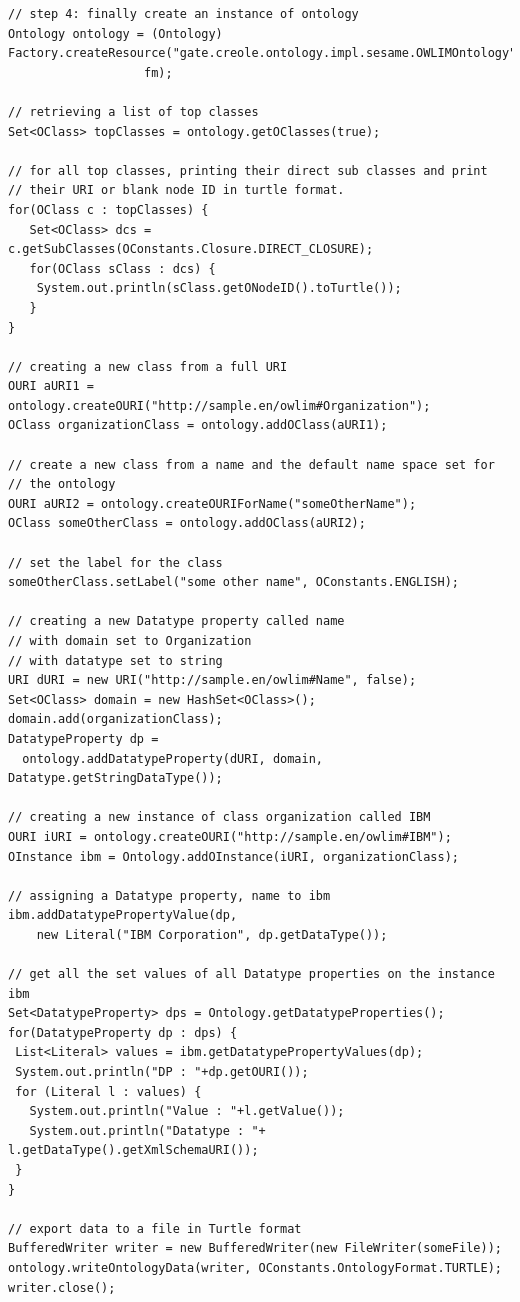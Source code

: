 {\begin{lstlisting}
// step 4: finally create an instance of ontology
Ontology ontology = (Ontology)
Factory.createResource("gate.creole.ontology.impl.sesame.OWLIMOntology",
                   fm);

// retrieving a list of top classes
Set<OClass> topClasses = ontology.getOClasses(true);

// for all top classes, printing their direct sub classes and print 
// their URI or blank node ID in turtle format.
for(OClass c : topClasses) {
   Set<OClass> dcs = c.getSubClasses(OConstants.Closure.DIRECT_CLOSURE);
   for(OClass sClass : dcs) {
	System.out.println(sClass.getONodeID().toTurtle());
   }
}

// creating a new class from a full URI
OURI aURI1 = ontology.createOURI("http://sample.en/owlim#Organization");
OClass organizationClass = ontology.addOClass(aURI1);

// create a new class from a name and the default name space set for 
// the ontology
OURI aURI2 = ontology.createOURIForName("someOtherName");
OClass someOtherClass = ontology.addOClass(aURI2);

// set the label for the class
someOtherClass.setLabel("some other name", OConstants.ENGLISH);

// creating a new Datatype property called name
// with domain set to Organization
// with datatype set to string
URI dURI = new URI("http://sample.en/owlim#Name", false);
Set<OClass> domain = new HashSet<OClass>();
domain.add(organizationClass);
DatatypeProperty dp = 
  ontology.addDatatypeProperty(dURI, domain, Datatype.getStringDataType());

// creating a new instance of class organization called IBM
OURI iURI = ontology.createOURI("http://sample.en/owlim#IBM");
OInstance ibm = Ontology.addOInstance(iURI, organizationClass);

// assigning a Datatype property, name to ibm
ibm.addDatatypePropertyValue(dp,
    new Literal("IBM Corporation", dp.getDataType());

// get all the set values of all Datatype properties on the instance ibm
Set<DatatypeProperty> dps = Ontology.getDatatypeProperties();
for(DatatypeProperty dp : dps) {
 List<Literal> values = ibm.getDatatypePropertyValues(dp);
 System.out.println("DP : "+dp.getOURI());
 for (Literal l : values) {
   System.out.println("Value : "+l.getValue());
   System.out.println("Datatype : "+ l.getDataType().getXmlSchemaURI());
 }
}

// export data to a file in Turtle format
BufferedWriter writer = new BufferedWriter(new FileWriter(someFile));
ontology.writeOntologyData(writer, OConstants.OntologyFormat.TURTLE);
writer.close();
\end{lstlisting}

}
